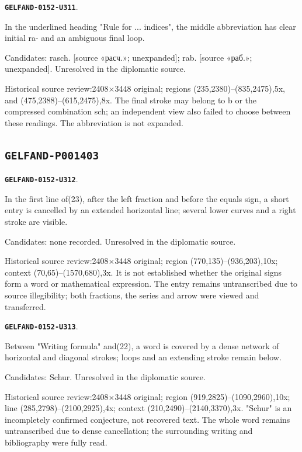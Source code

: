 \documentclass[11pt]{article}
\theoremstyle{definition}
\theoremstyle{remark}
\begin{document}
\par\noindent\leavevmode{}\label{GELFAND-0152-U311}\label{GELFAND-P001402:rule-abbreviation:note}\textbf{\texttt{GELFAND-0152-U311}}.\nopagebreak[4]\par
In the underlined heading "Rule for ... indices", the middle abbreviation has clear initial ra- and an ambiguous final loop.\par
Candidates: rasch. [source «расч.»; unexpanded]; rab. [source «раб.»; unexpanded]. Unresolved in the diplomatic source.\par
Historical source review:2408×3448 original; regions (235,2380)–(835,2475),5x, and (475,2388)–(615,2475),8x. The final stroke may belong to b or the compressed combination sch; an independent view also failed to choose between these readings. The abbreviation is not expanded.\par\medskip
\subsection*{\texttt{GELFAND-P001403}}
\par\noindent\leavevmode{}\label{GELFAND-0152-U312}\label{GELFAND-P001403:generating-cancelled:note}\textbf{\texttt{GELFAND-0152-U312}}.\nopagebreak[4]\par
In the first line of(23), after the left fraction and before the equals sign, a short entry is cancelled by an extended horizontal line; several lower curves and a right stroke are visible.\par
Candidates: none recorded. Unresolved in the diplomatic source.\par
Historical source review:2408×3448 original; region (770,135)–(936,203),10x; context (70,65)–(1570,680),3x. It is not established whether the original signs form a word or mathematical expression. The entry remains untranscribed due to source illegibility; both fractions, the series and arrow were viewed and transferred.\par\medskip
\par\noindent\leavevmode{}\label{GELFAND-0152-U313}\label{GELFAND-P001403:bottom-cancelled-word:note}\textbf{\texttt{GELFAND-0152-U313}}.\nopagebreak[4]\par
Between "Writing formula" and(22), a word is covered by a dense network of horizontal and diagonal strokes; loops and an extending stroke remain below.\par
Candidates: Schur. Unresolved in the diplomatic source.\par
Historical source review:2408×3448 original; region (919,2825)–(1090,2960),10x; line (285,2798)–(2100,2925),4x; context (210,2490)–(2140,3370),3x. "Schur" is an incompletely confirmed conjecture, not recovered text. The whole word remains untranscribed due to dense cancellation; the surrounding writing and bibliography were fully read.\par\medskip
\end{document}
